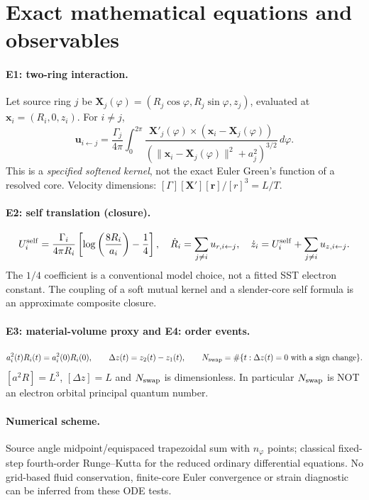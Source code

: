 \documentclass[10pt,a4paper]{article}
\begin{document}
\section{Exact mathematical equations and observables}
\paragraph{E1: two-ring interaction.} Let source ring $j$ be
$\mathbf X_j(\varphi)=(R_j\cos\varphi,R_j\sin\varphi,z_j)$, evaluated at $\mathbf x_i=(R_i,0,z_i)$. For $i\neq j$,
\begin{equation}
\mathbf u_{i\leftarrow j}=\frac{\Gamma_j}{4\pi}\int_0^{2\pi}
 \frac{\mathbf X'_j(\varphi)\times(\mathbf x_i-\mathbf X_j(\varphi))}
 {\left(\lVert\mathbf x_i-\mathbf X_j(\varphi)\rVert^2+a_j^2\right)^{3/2}}\,d\varphi.
\end{equation}
This is a \emph{specified softened kernel}, not the exact Euler Green's function of a resolved core. Velocity dimensions: $[\Gamma][\mathbf X'][\mathbf r]/[r]^3=L/T$.
\paragraph{E2: self translation (closure).}
\begin{equation}
 U_i^{\rm self}=\frac{\Gamma_i}{4\pi R_i}\left[\log\left(\frac{8R_i}{a_i}\right)-\frac14\right],\quad
 \dot R_i=\sum_{j\ne i}u_{r,i\leftarrow j},\quad
 \dot z_i=U_i^{\rm self}+\sum_{j\ne i}u_{z,i\leftarrow j}.
\end{equation}
The $1/4$ coefficient is a conventional model choice, not a fitted SST electron constant. The coupling of a soft mutual kernel and a slender-core self formula is an approximate composite closure.
\paragraph{E3: material-volume proxy and E4: order events.}
\begin{equation}
 a_i^2(t)R_i(t)=a_i^2(0)R_i(0),\qquad
 \Delta z(t)=z_2(t)-z_1(t),\qquad N_{\rm swap}=\#\{t:\Delta z(t)=0\text{ with a sign change}\}.
\end{equation}
$[a^2R]=L^3$, $[\Delta z]=L$ and $N_{\rm swap}$ is dimensionless. In particular $N_{\rm swap}$ is NOT an electron orbital principal quantum number.
\paragraph{Numerical scheme.} Source angle midpoint/equispaced trapezoidal sum with $n_\varphi$ points; classical fixed-step fourth-order Runge--Kutta for the reduced ordinary differential equations. No grid-based fluid conservation, finite-core Euler convergence or strain diagnostic can be inferred from these ODE tests.
\end{document}
